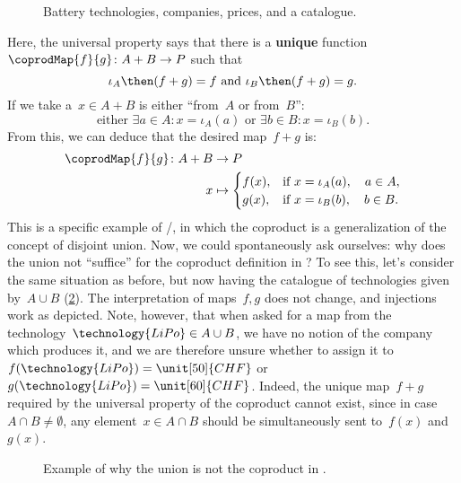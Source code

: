 \begin{example}
  \begin{figure}[h!]
    \begin{center}
    \end{center}
    \caption{Battery technologies, companies, prices, and a catalogue.}
    \label{fig:coprod_batteries_1}
  \end{figure}


  Here, the universal property says that there is a \textbf{unique} function~$\coprodMap{f}{g}\colon A+B\to P$ such that
  \begin{equation}\label{eq:exa-batt-factoring-maps}
    \iota_A\then (f+ g)=f \text{ and }\iota_B\then (f+ g)=g.
  \end{equation}
  If we take a~$x\in A+B$ is either ``from~$A$ or from~$B$'':
  \begin{equation}\label{eq:exa-batt-explain-sum-map}
    \text{either } \exists a\in A:x=\iota_A(a) \text{ or }\exists b\in B:x=\iota_B(b).
  \end{equation}
  From this, we can deduce that the desired map~$f+g$ is:
  \begin{equation}\label{eq:exa-batt-def-sum-map}
    \begin{aligned}
      \coprodMap{f}{g} \colon  A + B &\to P \\
      x &   \mapsto
      \begin{cases}
        f(x),& \text{if } x=\iota_A(a),\quad a \in A, \\
        g(x),& \text{if } x=\iota_B(b),\quad b \in B.
      \end{cases}
    \end{aligned}
  \end{equation}
  This is a specific example of \Set/\FinSet, in which the coproduct is a generalization of the concept of disjoint union.
  Now, we could spontaneously ask ourselves: why does the union not ``suffice'' for the coproduct definition in \Set?
  To see this, let's consider the same situation as before, but now having the catalogue of technologies given by~$A\cup B$ (\cref{fig:coprod_batteries_2}).
  The interpretation of maps~$f,g$ does not change, and injections work as depicted.
  Note, however, that when asked for a map from the technology~$\technology{LiPo}\in A\cup B$, we have no notion of the company which produces it, and we are therefore unsure whether to assign it to~$f(\technology{LiPo})=\unit[50]{CHF}$ or~$g(\technology{LiPo})=\unit[60]{CHF}$.
  Indeed, the unique map~$f+g$ required by the universal property of the coproduct cannot exist, since in case~$A\cap B\neq \emptyset$, any element~$x\in A\cap B$ should be simultaneously sent to~$f(x)$ and~$g(x)$.

  \begin{figure}[h!]
    \begin{center}
    \end{center}
    \caption{Example of why the union is not the coproduct in \Set.}
    \label{fig:coprod_batteries_2}
  \end{figure}
\end{example}


